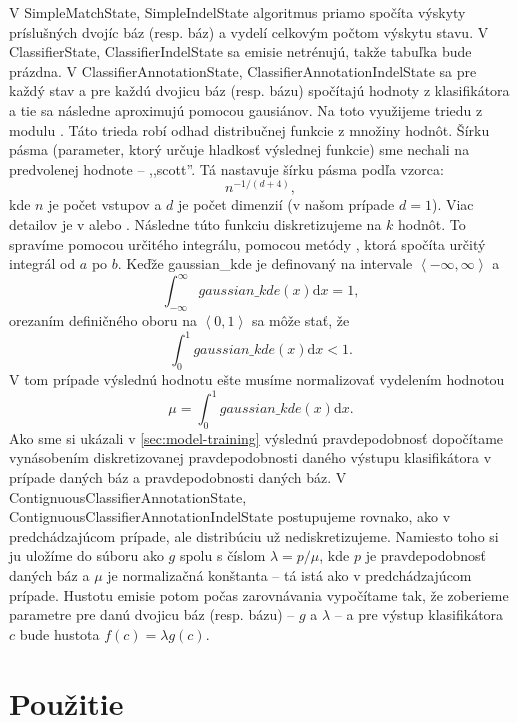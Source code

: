 V SimpleMatchState, SimpleIndelState algoritmus priamo spočíta výskyty príslušných dvojíc báz (resp. báz) a vydelí celkovým počtom výskytu stavu.
V ClassifierState, ClassifierIndelState sa emisie netrénujú, takže tabuľka bude prázdna.
V ClassifierAnnotationState, ClassifierAnnotationIndelState sa pre každý stav a pre každú dvojicu báz (resp. bázu) spočítajú hodnoty z klasifikátora a tie sa následne aproximujú pomocou gausiánov. Na toto využijeme triedu  z modulu . Táto trieda robí odhad distribučnej funkcie z množiny hodnôt. Šírku pásma (parameter, ktorý určuje hladkosť výslednej funkcie) sme nechali na predvolenej hodnote -- ,,scott''. Tá nastavuje šírku pásma podľa vzorca:
$$n^{-1/(d+4)},$$
kde $n$ je počet vstupov a $d$ je počet dimenzií (v našom prípade $d = 1$). Viac detailov je v \cite{scipydoc} alebo \cite{wiki:kde, rosenblatt1956remarks}. Následne túto funkciu diskretizujeme na $k$ hodnôt. To spravíme pomocou určitého integrálu, pomocou metódy , ktorá spočíta určitý integrál od $a$ po $b$.
Keďže gaussian\_kde je definovaný na intervale $\left<-\infty, \infty \right>$ a $$\int_{-\infty}^\infty \! gaussian\_kde(x) \mathrm{d}x = 1,$$ orezaním definičného oboru na $\left<0,1\right>$ sa môže stať, že $$\int_0^1 \! gaussian\_kde(x) \mathrm{d}x < 1.$$ V tom prípade výslednú hodnotu ešte musíme normalizovať vydelením hodnotou $$\mu = \int_0^1 \! gaussian\_kde(x) \mathrm{d}x.$$ Ako sme si ukázali v \ref{sec:model-training} výslednú pravdepodobnosť dopočítame vynásobením diskretizovanej pravdepodobnosti daného výstupu klasifikátora v prípade daných báz a pravdepodobnosti daných báz.
V ContignuousClassifierAnnotationState, ContignuousClassifierAnnotationIndelState postupujeme rovnako, ako v predchádzajúcom prípade, ale distribúciu už nediskretizujeme. Namiesto toho si ju uložíme do súboru ako $g$ spolu s číslom $\lambda = p/\mu$, kde $p$ je pravdepodobnosť daných báz a $\mu$ je normalizačná konštanta -- tá istá ako v predchádzajúcom prípade. Hustotu emisie potom počas zarovnávania vypočítame tak, že zoberieme parametre pre danú dvojicu báz (resp. bázu) -- $g$ a $\lambda$ -- a pre výstup klasifikátora $c$ bude hustota $f(c) = \lambda g(c).$

\section{Použitie}

